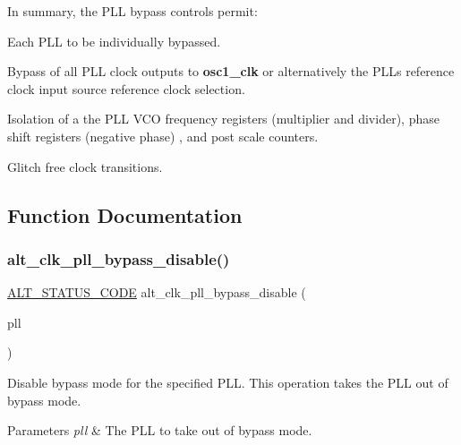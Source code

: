 In summary, the P\+LL bypass controls permit\+:
\begin{DoxyItemize}
\item Each P\+LL to be individually bypassed.
\item Bypass of all P\+LL clock outputs to {\bfseries{osc1\+\_\+clk}} or alternatively the P\+L\+Ls reference clock input source reference clock selection.
\item Isolation of a the P\+LL V\+CO frequency registers (multiplier and divider), phase shift registers (negative phase) , and post scale counters.
\item Glitch free clock transitions. 
\end{DoxyItemize}

\subsection{Function Documentation}
\mbox{\label{group__CLK__MGR__BYPASS_gabf3771138273ff77637fd6ad758347c0}} 
\subsubsection{\texorpdfstring{alt\_clk\_pll\_bypass\_disable()}{alt\_clk\_pll\_bypass\_disable()}}
{\footnotesize\ttfamily \mbox{\hyperlink{hwlib_8h_abdb0d369f069723ca55d6c94bcaaaa12}{A\+L\+T\+\_\+\+S\+T\+A\+T\+U\+S\+\_\+\+C\+O\+DE}} alt\+\_\+clk\+\_\+pll\+\_\+bypass\+\_\+disable (\begin{DoxyParamCaption}\item[{\mbox{\hyperlink{group__CLK__MGR_ga4cdb80e84284365fe3d47c2f8050b13d}{A\+L\+T\+\_\+\+C\+L\+K\+\_\+t}}}]{pll }\end{DoxyParamCaption})}

Disable bypass mode for the specified P\+LL. This operation takes the P\+LL out of bypass mode.


\begin{DoxyParams}{Parameters}
{\em pll} & The P\+LL to take out of bypass mode.\\
\hline
\end{DoxyParams}

